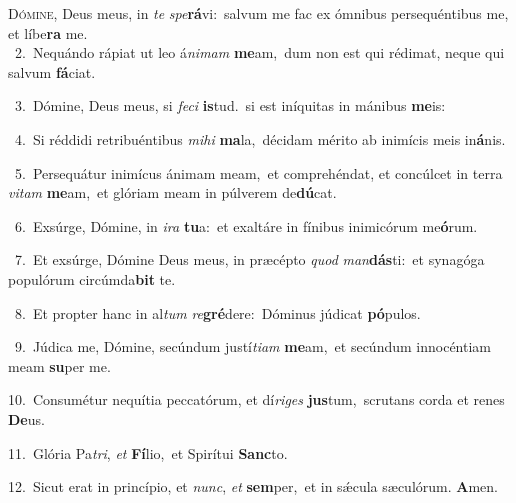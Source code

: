 \lettrine{\initial\textcolor{\initialcolor}{D}}{ómine,} Deus meus, in \textit{te} \textit{spe}\-\textbf{rá}vi:~\star salvum me fac ex ómnibus persequéntibus me, et líbe\textbf{ra} me.\\
{\numbfont\textcolor{\numbcolor}{~2.}}~Nequándo rápiat ut leo á\-\textit{ni}\-\textit{mam} \textbf{me}\-am,~\star dum non est qui rédimat, neque qui salvum \textbf{fá}\-ciat.\par
{\numbfont\textcolor{\numbcolor}{~3.}}~Dómine, Deus meus, si \textit{fe}\-\textit{ci} \textbf{is}\-tud.~\star si est iníquitas in mánibus \textbf{me}\-is:\par
{\numbfont\textcolor{\numbcolor}{~4.}}~Si réddidi retribuéntibus \textit{mi}\-\textit{hi} \textbf{ma}\-la,~\star décidam mérito ab inimícis meis in\-\textbf{á}\-nis.\par
{\numbfont\textcolor{\numbcolor}{~5.}}~Persequátur inimícus ánimam meam,~\dagger et comprehéndat, et concúlcet in terra \textit{vi}\-\textit{tam} \textbf{me}\-am,~\star et glóriam meam in púlverem de\-\textbf{dú}\-cat.\par
{\numbfont\textcolor{\numbcolor}{~6.}}~Exsúrge, Dómine, in \textit{i}\-\textit{ra} \textbf{tu}\-a:~\star et exaltáre in fínibus inimicórum me\-\textbf{ó}\-rum.\par
{\numbfont\textcolor{\numbcolor}{~7.}}~Et exsúrge, Dómine Deus meus, in præcépto \textit{quod} \textit{man}\-\textbf{dás}ti:~\star et synagóga populórum circúmda\textbf{bit} te.\par
{\numbfont\textcolor{\numbcolor}{~8.}}~Et propter hanc in al\textit{tum} \textit{re}\-\textbf{gré}dere:~\star Dóminus júdicat \textbf{pó}\-pulos.\par
{\numbfont\textcolor{\numbcolor}{~9.}}~Júdica me, Dómine, secúndum justí\-\textit{ti}\-\textit{am} \textbf{me}\-am,~\star et secúndum innocéntiam meam \textbf{su}\-per me.\par
{\numbfont\textcolor{\numbcolor}{10.}}~Consumétur nequítia peccatórum, et dí\-\textit{ri}\-\textit{ges} \textbf{jus}\-tum,~\star scrutans corda et renes \textbf{De}\-us.\par
{\numbfont\textcolor{\numbcolor}{11.}}~Glória Pa\-\textit{tri}\-, \textit{et} \textbf{Fí}\-lio,~\star et Spirítui \textbf{Sanc}\-to.\par
{\numbfont\textcolor{\numbcolor}{12.}}~Sicut erat in princípio, et \textit{nunc}\-, \textit{et} \textbf{sem}\-per,~\star et in sǽcula sæculórum. \textbf{A}\-men.\par
